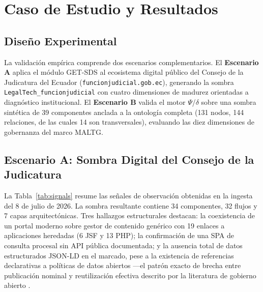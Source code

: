 \documentclass[computers,article,submit,pdftex,moreauthors]{Definitions/mdpi}
\begin{document}
\section{Caso de Estudio y Resultados}
\label{sec:results}

\subsection{Diseño Experimental}
La validación empírica comprende dos escenarios complementarios. El \textbf{Escenario A} aplica el módulo GET-SDS al ecosistema digital público del Consejo de la Judicatura del Ecuador (\texttt{funcionjudicial.gob.ec}), generando la sombra \texttt{LegalTech\_funcionjudicial} con cuatro dimensiones de madurez orientadas a diagnóstico institucional. El \textbf{Escenario B} valida el motor $\Psi$/$\delta$ sobre una sombra sintética de 39 componentes anclada a la ontología completa (131 nodos, 144 relaciones, de las cuales 14 son transversales), evaluando las diez dimensiones de gobernanza del marco MALTG.

\subsection{Escenario A: Sombra Digital del Consejo de la Judicatura}
La Tabla~\ref{tab:signals} resume las señales de observación obtenidas en la ingesta del 8 de julio de 2026. La sombra resultante contiene 34 componentes, 32 flujos y 7 capas arquitectónicas. Tres hallazgos estructurales destacan: la coexistencia de un portal moderno sobre gestor de contenido genérico con 19 enlaces a aplicaciones heredadas (6 JSF y 13 PHP); la confirmación de una SPA de consulta procesal sin API pública documentada; y la ausencia total de datos estructurados JSON-LD en el marcado, pese a la existencia de referencias declarativas a políticas de datos abiertos —el patrón exacto de brecha entre publicación nominal y reutilización efectiva descrito por la literatura de gobierno abierto \cite{Janssen2012,Attard2015}.
\end{document}
